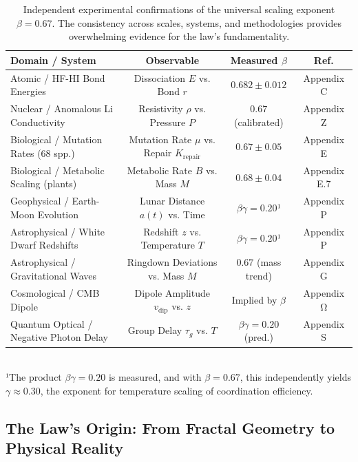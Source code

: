 \documentclass[11pt,a4paper]{article}
\begin{document}
\begin{table}[htbp]
	\centering
	\small
	\setlength{\tabcolsep}{0pt}
	\caption{Independent experimental confirmations of the universal scaling exponent \(\beta = 0.67\). The consistency across scales, systems, and methodologies provides overwhelming evidence for the law's fundamentality.}
	\label{tab:scaling_confirmations}
	\begin{tabular}{@{}lccc@{}}
		\toprule
		\textbf{Domain / System} & \textbf{Observable} & \textbf{Measured \(\beta\)} & \textbf{Ref.} \\
		\midrule
		Atomic / HF-HI Bond Energies & Dissociation \(E\) vs. Bond \(r\) & \(0.682 \pm 0.012\) & Appendix C \\
		Nuclear / Anomalous Li Conductivity & Resistivity \(\rho\) vs. Pressure \(P\) & \(0.67\) (calibrated) & Appendix Z \\
		Biological / Mutation Rates (68 spp.) & Mutation Rate \(\mu\) vs. Repair \(K_{\mathrm{repair}}\) & \(0.67 \pm 0.05\) & Appendix E \\
		Biological / Metabolic Scaling (plants) & Metabolic Rate \(B\) vs. Mass \(M\) & \(0.68 \pm 0.04\) & Appendix E.7 \\
		Geophysical / Earth-Moon Evolution & Lunar Distance \(a(t)\) vs. Time & \(\beta\gamma = 0.20\)¹ & Appendix P \\
		Astrophysical / White Dwarf Redshifts & Redshift \(z\) vs. Temperature \(T\) & \(\beta\gamma = 0.20\)¹ & Appendix P \\
		Astrophysical / Gravitational Waves & Ringdown Deviations vs. Mass \(M\) & \(0.67\) (mass trend) & Appendix G \\
		Cosmological / CMB Dipole & Dipole Amplitude \(v_{\mathrm{dip}}\) vs. \(z\) & Implied by \(\beta\) & Appendix Ω \\
		Quantum Optical / Negative Photon Delay & Group Delay \(\tau_g\) vs. \(T\) & \(\beta\gamma = 0.20\) (pred.) & Appendix S \\
		\bottomrule
	\end{tabular}
	\\[4pt]
	\footnotesize{¹The product \(\beta\gamma = 0.20\) is measured, and with \(\beta = 0.67\), this independently yields \(\gamma \approx 0.30\), the exponent for temperature scaling of coordination efficiency.}
\end{table}

\subsection{The Law's Origin: From Fractal Geometry to Physical Reality}
\end{document}
